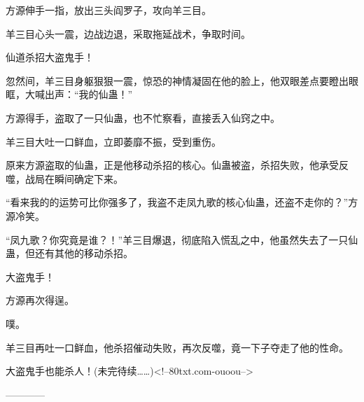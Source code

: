 \begin{this_body}
方源伸手一指，放出三头阎罗子，攻向羊三目。

羊三目心头一震，边战边退，采取拖延战术，争取时间。

仙道杀招大盗鬼手！

忽然间，羊三目身躯狠狠一震，惊恐的神情凝固在他的脸上，他双眼差点要瞪出眼眶，大喊出声：“我的仙蛊！”

方源得手，盗取了一只仙蛊，也不忙察看，直接丢入仙窍之中。

羊三目大吐一口鲜血，立即萎靡不振，受到重伤。

原来方源盗取的仙蛊，正是他移动杀招的核心。仙蛊被盗，杀招失败，他承受反噬，战局在瞬间确定下来。

“看来我的的运势可比你强多了，我盗不走凤九歌的核心仙蛊，还盗不走你的？”方源冷笑。

“凤九歌？你究竟是谁？！”羊三目爆退，彻底陷入慌乱之中，他虽然失去了一只仙蛊，但还有其他的移动杀招。

大盗鬼手！

方源再次得逞。

噗。

羊三目再吐一口鲜血，他杀招催动失败，再次反噬，竟一下子夺走了他的性命。

大盗鬼手也能杀人！(未完待续……)<!--80txt.com-ouoou-->

------------

\end{this_body}

